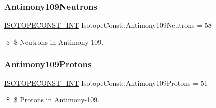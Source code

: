 \subsubsection{\texorpdfstring{Antimony109\+Neutrons}{Antimony109Neutrons}}
{\footnotesize\ttfamily \mbox{\hyperlink{group___isotope_const-_macros_ga5f18360b3e99483a35c32d789e62621c}{I\+S\+O\+T\+O\+P\+E\+C\+O\+N\+S\+T\+\_\+\+I\+NT}} Isotope\+Const\+::\+Antimony109\+Neutrons = 58}

\$ \$ Neutrons in Antimony-\/109. \mbox{\label{group___isotope_const-_antimony-_sb109_ga9418dbda96f2aaabc75ecd9682a488e2}} 
\subsubsection{\texorpdfstring{Antimony109\+Protons}{Antimony109Protons}}
{\footnotesize\ttfamily \mbox{\hyperlink{group___isotope_const-_macros_ga5f18360b3e99483a35c32d789e62621c}{I\+S\+O\+T\+O\+P\+E\+C\+O\+N\+S\+T\+\_\+\+I\+NT}} Isotope\+Const\+::\+Antimony109\+Protons = 51}

\$ \$ Protons in Antimony-\/109. 